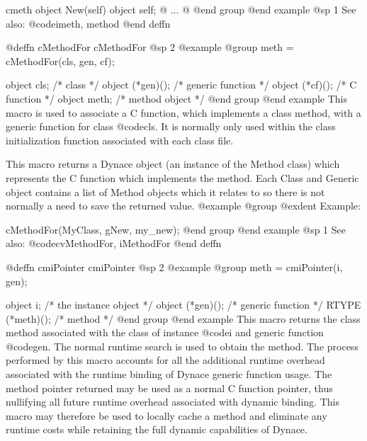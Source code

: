 {{{{cmeth object  New(self)
object self;
@{
        ...
@}
@end group
@end example
@sp 1
See also:  @code{imeth, method}
@end deffn














@deffn {cMethodFor} cMethodFor
@sp 2
@example
@group
meth = cMethodFor(cls, gen, cf);

object  cls;            /*  class               */
object  (*gen)();       /*  generic function    */
object  (*cf)();        /*  C function          */
object  meth;           /*  method object       */
@end group
@end example
This macro is used to associate a C function, which implements a class
method, with a generic function for class @code{cls}. It is normally only
used within the class initialization function associated with each class
file.

This macro returns a Dynace object (an instance of the Method class) which
represents the C function which implements the method.  Each Class 
and Generic object contains a list of Method objects which it relates
to so there is not normally a need to save the returned value.
@example
@group
@exdent Example:

cMethodFor(MyClass, gNew, my_new);
@end group
@end example
@sp 1
See also:  @code{cvMethodFor, iMethodFor}
@end deffn

















@deffn {cmiPointer} cmiPointer
@sp 2
@example
@group
meth = cmiPointer(i, gen);

object  i;              /*  the instance object */
object  (*gen)();       /*  generic function    */
RTYPE   (*meth)();      /*  method              */
@end group
@end example
This macro returns the class method associated with the class of
instance @code{i} and generic function @code{gen}.  The normal runtime
search is used to obtain the method.  The process performed by this
macro accounts for all the additional runtime overhead associated with
the runtime binding of Dynace generic function usage.  The method pointer
returned may be used as a normal C function pointer, thus nullifying all
future runtime overhead associated with dynamic binding.  This macro may
therefore be used to locally cache a method and eliminate any runtime
costs while retaining the full dynamic capabilities of Dynace.

}}}}
